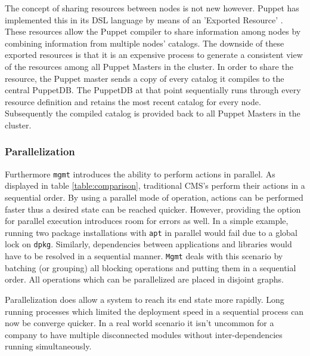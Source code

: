 The concept of sharing resources between nodes is not new however. Puppet has implemented this in its DSL language by means of an 'Exported Resource' \cite{exported_2016}. These resources allow the Puppet compiler to share information among nodes by combining information from multiple nodes’ catalogs. The downside of these exported resources is that it is an expensive process to generate a consistent view of the resources among all Puppet Masters in the cluster. In order to share the resource, the Puppet master sends a copy of every catalog it compiles to the central PuppetDB. The PuppetDB at that point sequentially runs through every resource definition and retains the most recent catalog for every node. Subsequently the compiled catalog is provided back to all Puppet Masters in the cluster.

\subsubsection{Parallelization}
Furthermore \texttt{mgmt} introduces the ability to perform actions in parallel. As displayed in table \ref{table:comparison}, traditional CMS's perform their actions in a sequential order. By using a parallel mode of operation, actions can be performed faster thus a desired state can be reached quicker. However, providing the option for parallel execution introduces room for errors as well. In a simple example, running two package installations with \texttt{apt} in parallel would fail due to a global lock on \texttt{dpkg}. Similarly, dependencies between applications and libraries would have to be resolved in a sequential manner. \texttt{Mgmt} deals with this scenario by batching (or grouping) all blocking operations and putting them in a sequential order. All operations which can be parallelized are placed in disjoint graphs. 

Parallelization does allow a system to reach its end state more rapidly. Long running processes which limited the deployment speed in a sequential process can now be converge quicker. In a real world scenario it isn't uncommon for a company to have multiple disconnected modules without inter-dependencies running simultaneously. 

